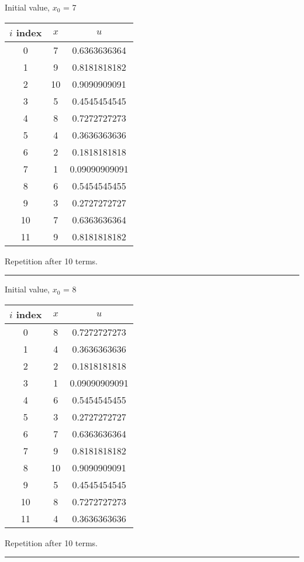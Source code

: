 \documentclass{article}
\begin{document}
Initial value, $x_0$ = 7
\begin{center} \begin{tabular}{||c | c | c||}  \hline
		$i$ index & $x$ & $u$ \\ [0.5ex] \hline \hline0 & 7 & 0.6363636364\\
		\hline 
		1 & 9 & 0.8181818182\\
		\hline 
		2 & 10 & 0.9090909091\\
		\hline 
		3 & 5 & 0.4545454545\\
		\hline 
		4 & 8 & 0.7272727273\\
		\hline 
		5 & 4 & 0.3636363636\\
		\hline 
		6 & 2 & 0.1818181818\\
		\hline 
		7 & 1 & 0.09090909091\\
		\hline 
		8 & 6 & 0.5454545455\\
		\hline 
		9 & 3 & 0.2727272727\\
		\hline 
		10 & 7 & 0.6363636364\\
		\hline 
		11 & 9 & 0.8181818182\\
		\hline 
	\end{tabular} 
\end{center} Repetition after 10 terms.
\\ \noindent\rule[0.5ex]{\linewidth}{1pt}
Initial value, $x_0$ = 8
\begin{center} \begin{tabular}{||c | c | c||}  \hline
		$i$ index & $x$ & $u$ \\ [0.5ex] \hline \hline0 & 8 & 0.7272727273\\
		\hline 
		1 & 4 & 0.3636363636\\
		\hline 
		2 & 2 & 0.1818181818\\
		\hline 
		3 & 1 & 0.09090909091\\
		\hline 
		4 & 6 & 0.5454545455\\
		\hline 
		5 & 3 & 0.2727272727\\
		\hline 
		6 & 7 & 0.6363636364\\
		\hline 
		7 & 9 & 0.8181818182\\
		\hline 
		8 & 10 & 0.9090909091\\
		\hline 
		9 & 5 & 0.4545454545\\
		\hline 
		10 & 8 & 0.7272727273\\
		\hline 
		11 & 4 & 0.3636363636\\
		\hline 
	\end{tabular} 
\end{center} Repetition after 10 terms.
\\ \noindent\rule[0.5ex]{\linewidth}{1pt}
\pagebreak
\end{document}

